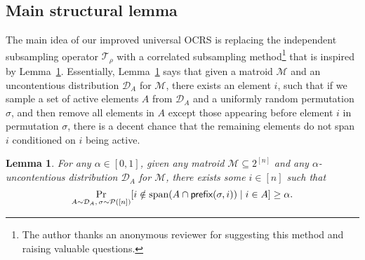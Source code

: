 \documentclass[11pt]{article}
\newcommand{\D}{\mathcal D}
\newcommand{\M}{{\mathcal M}}
\newcommand{\cP}{\mathcal P}
\newcommand{\T}{{\mathcal T}}
\newcommand{\pref}{\textnormal{\sffamily prefix}}
\newcommand{\spa}{\textnormal{span}}
\newtheorem{lemma}[theorem]{Lemma}
\begin{document}
\subsection{Main structural lemma}
The main idea of our improved universal OCRS is replacing the independent subsampling operator $\T_{\rho}$ with a correlated subsampling method\footnote{The author thanks an anonymous reviewer for suggesting this method and raising valuable questions.} that is inspired by Lemma~\ref{lem:uncontentious_preceding_elements}. Essentially, Lemma~\ref{lem:uncontentious_preceding_elements} says that given a matroid $\M$ and an uncontentious distribution $\D_A$ for $\M$, there exists an element $i$, such that if we sample a set of active elements $A$ from $\D_A$ and a uniformly random permutation $\sigma$, and then remove all elements in $A$ except those appearing before element $i$ in permutation $\sigma$, there is a decent chance that the remaining elements do not span $i$ conditioned on $i$ being active.
\begin{lemma}\label{lem:uncontentious_preceding_elements}
For any $\alpha\in[0,1]$, given any matroid $\M\subseteq 2^{[n]}$ and any $\alpha$-uncontentious distribution $\D_A$ for $\M$, there exists some $i\in[n]$ such that
\[
    \Pr_{A\sim\D_A,\,\sigma\sim\cP([n])}[i \notin\spa(A\cap\pref(\sigma,i))\mid i\in A]\ge \alpha.
\]
\end{lemma}
\end{document}
